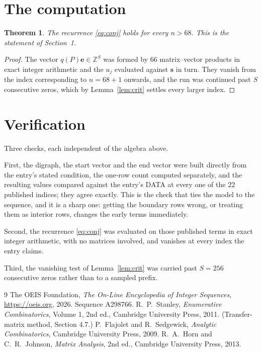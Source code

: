 \documentclass[11pt,a4paper]{article}
\theoremstyle{plain}
\newtheorem{theorem}{Theorem}
\theoremstyle{definition}
\begin{document}
\section{The computation}

\begin{theorem}
The recurrence \eqref{eq:conj} holds for every $n>68$. This is the statement of
Section~1.
\end{theorem}

\begin{proof}
The vector $q(P)\mathbf{e}\in\mathbb{Z}^{S}$ was formed by $66$ matrix--vector
products in exact integer arithmetic and the $u_j$ evaluated against $\mathbf{s}$ in turn.
They vanish from the index corresponding to $n=68+1$ onwards, and the run was continued
past $S$ consecutive zeros, which by Lemma~\ref{lem:crit} settles every larger index.
\end{proof}

\section{Verification}

Three checks, each independent of the algebra above.

First, the digraph, the start vector and the end vector were built directly from the
entry's stated condition, the one-row count computed separately, and the resulting values
compared against the entry's DATA at every one of the $22$ published indices; they
agree exactly. This is the check that ties the model to the sequence, and it is a sharp one:
getting the boundary rows wrong, or treating them as interior rows, changes the early terms
immediately.

Second, the recurrence \eqref{eq:conj} was evaluated on those published terms in exact
integer arithmetic, with no matrices involved, and vanishes at every index the entry claims.

Third, the vanishing test of Lemma~\ref{lem:crit} was carried past $S=256$ consecutive
zeros rather than to a sampled prefix.

\begin{thebibliography}{9}
 The OEIS Foundation, \emph{The On-Line Encyclopedia of Integer
Sequences}, \url{https://oeis.org}, 2026. Sequence A298766.
 R.~P.~Stanley, \emph{Enumerative Combinatorics}, Volume 1, 2nd ed.,
Cambridge University Press, 2011. (Transfer-matrix method, Section 4.7.)
 P.~Flajolet and R.~Sedgewick, \emph{Analytic Combinatorics}, Cambridge
University Press, 2009.
 R.~A.~Horn and C.~R.~Johnson, \emph{Matrix Analysis}, 2nd ed., Cambridge
University Press, 2013.
\end{thebibliography}
\end{document}
